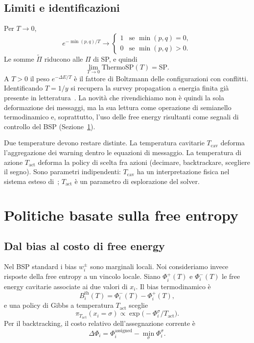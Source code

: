 \documentclass{article}
\newcommand{\Tc}{T_{\mathrm{cav}}}
\newcommand{\Ta}{T_{\mathrm{act}}}
\begin{document}
\subsection{Limiti e identificazioni}

Per $T\to 0$,
\begin{equation}
  e^{-\min(p,q)/T}
  \to
  \begin{cases}
  1 & \text{se }\min(p,q)=0,\\
  0 & \text{se }\min(p,q)>0.
  \end{cases}
\end{equation}
Le somme $\widetilde{\Pi}$ riducono alle $\Pi$ di SP, e quindi
\begin{equation}
  \lim_{T\to 0}\mathrm{ThermoSP}(T)=\mathrm{SP}.
\end{equation}
A $T>0$ il peso $e^{-\Delta E/T}$ \`e il fattore di Boltzmann delle configurazioni con conflitti.
Identificando $T=1/y$ si recupera la survey propagation a energia finita gi\`a presente in letteratura~\cite{braunstein2004surveybp,wemmenhove2007finite}.
La novit\`a che rivendichiamo non \`e quindi la sola deformazione dei messaggi, ma la sua lettura come operazione di semianello termodinamico e, soprattutto, l'uso delle free energy risultanti come segnali di controllo del BSP (Sezione~\ref{sec:policy}).

Due temperature devono restare distinte.
La temperatura cavitarie $\Tc$ deforma l'aggregazione dei warning dentro le equazioni di messaggio.
La temperatura di azione $\Ta$ deforma la policy di scelta fra azioni (decimare, backtrackare, scegliere il segno).
Sono parametri indipendenti: $\Tc$ ha un interpretazione fisica nel sistema esteso di~\cite{braunstein2004surveybp}; $\Ta$ \`e un parametro di esplorazione del solver.

\section{Politiche basate sulla free entropy}
\label{sec:policy}

\subsection{Dal bias al costo di free energy}

Nel BSP standard i bias $w_i^\pm$ sono marginali locali.
Noi consideriamo invece risposte della free entropy a un vincolo locale.
Siano $\Phi_i^+(T)$ e $\Phi_i^-(T)$ le free energy cavitarie associate ai due valori di $x_i$.
Il bias termodinamico \`e
\begin{equation}
  B_i^{\mathrm{th}}(T)=\Phi_i^-(T)-\Phi_i^+(T),
\end{equation}
e una policy di Gibbs a temperatura $\Ta$ sceglie
\begin{equation}
  \pi_{\Ta}(x_i=\sigma)
  \propto\exp\bigl(-\Phi_i^\sigma/\Ta\bigr).
\end{equation}
Per il backtracking, il costo relativo dell'assegnazione corrente \`e
\begin{equation}
  \Delta\Phi_i
  =\Phi_i^{\mathrm{assigned}}-\min_{\sigma}\Phi_i^\sigma.
\end{equation}
\end{document}
